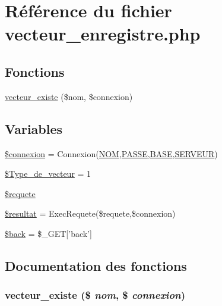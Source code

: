 \hypertarget{vecteur__enregistre_8php}{
\section{R\'{e}f\'{e}rence du fichier vecteur\_\-enregistre.php}
\label{vecteur__enregistre_8php}
}
\subsection*{Fonctions}
\begin{CompactItemize}
\item 
\hyperlink{vecteur__enregistre_8php_a5}{vecteur\_\-existe} (\$nom, \$connexion)
\end{CompactItemize}
\subsection*{Variables}
\begin{CompactItemize}
\item 
\hyperlink{vecteur__enregistre_8php_a0}{\$connexion} = Connexion(\hyperlink{pma__connect_8php_a0}{NOM},\hyperlink{pma__connect_8php_a1}{PASSE},\hyperlink{pma__connect_8php_a3}{BASE},\hyperlink{pma__connect_8php_a2}{SERVEUR})
\item 
\hyperlink{vecteur__enregistre_8php_a1}{\$Type\_\-de\_\-vecteur} = 1
\item 
\hyperlink{vecteur__enregistre_8php_a2}{\$requete}
\item 
\hyperlink{vecteur__enregistre_8php_a3}{\$resultat} = Exec\-Requete(\$requete,\$connexion)
\item 
\hyperlink{vecteur__enregistre_8php_a4}{\$back} = \$\_\-GET\mbox{[}'back'\mbox{]}
\end{CompactItemize}


\subsection{Documentation des fonctions}
\hypertarget{vecteur__enregistre_8php_a5}{
\subsubsection[vecteur\_\-existe]{\setlength{\rightskip}{0pt plus 5cm}vecteur\_\-existe (\$ {\em nom}, \$ {\em connexion})}}
\label{vecteur__enregistre_8php_a5}




